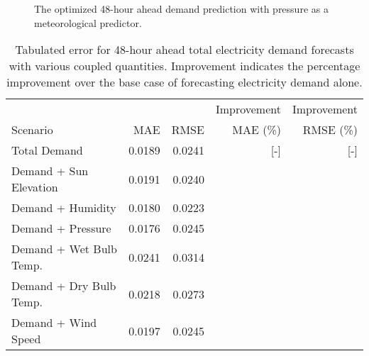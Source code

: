 \begin{figure*}[!ht]
  \centering
  
  \caption{The optimized 48-hour ahead demand prediction with pressure as a  meteorological
  predictor.}
  \label{fig:48demand}
\end{figure*}

  \begin{table*}[!ht]
    \centering
    \caption{Tabulated error for 48-hour ahead total electricity demand forecasts with various coupled quantities. Improvement indicates the percentage improvement over the base case of forecasting electricity demand alone.}
    \label{tab:demand48}
    \begin{tabular}{l|r|r|r|r}
      &  & & Improvement & Improvement \\
      Scenario  & MAE & RMSE & MAE (\%) & RMSE (\%)\\
      \hline
      Total Demand & 0.0189 & 0.0241 & [-] & [-] \\
      Demand + Sun Elevation & 0.0191 & 0.0240 & &  \\
      Demand + Humidity & 0.0180 & 0.0223 &  & \\
      Demand + Pressure & 0.0176 & 0.0245 &  & \\
      Demand + Wet Bulb Temp. & 0.0241 & 0.0314 & & \\
      Demand + Dry Bulb Temp. & 0.0218 & 0.0273 &  & \\
      Demand + Wind Speed & 0.0197 & 0.0245 &  & \\
    \end{tabular}
  \end{table*}
